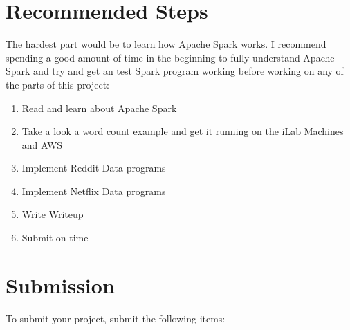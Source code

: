 \documentclass{article}
\begin{document}
\section{Recommended Steps}
The hardest part would be to learn how Apache Spark works. I recommend spending a good amount of time in the beginning to fully understand Apache Spark and try and get an test Spark program working before working on any of the parts of this project:

\begin{enumerate}
    \item Read and learn about Apache Spark 
    \item Take a look a word count example and get it running on the iLab Machines and AWS 
    \item Implement Reddit Data programs 
    \item Implement Netflix Data programs
    \item Write Writeup 
    \item Submit on time
\end{enumerate}

\section{Submission}
To submit your project, submit the following items:
\end{document}
